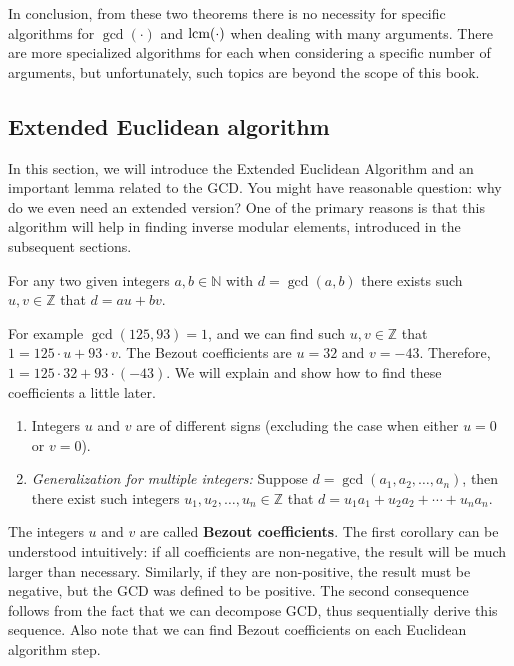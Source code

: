 \documentclass[../lecture-notes-148x210.tex]{subfiles}
\begin{document}
In conclusion, from these two theorems there is no necessity for specific
algorithms for $\gcd(\cdot)$ and $\text{lcm}(\cdot)$ when dealing with many arguments. There are
more specialized algorithms for each when considering a specific number of
arguments, but unfortunately, such topics are beyond the scope of this book.

\subsection{Extended Euclidean algorithm}

In this section, we will introduce the Extended Euclidean Algorithm and an
important lemma related to the GCD. You might have reasonable question: why do
we even need an extended version? One of the primary reasons is that this 
algorithm will help in finding inverse modular elements, introduced in the 
subsequent sections.

\begin{lemma}  \label{lemma:bezout_identity}
    For any two given integers $a, b \in \mathbb{N}$ with $d = \gcd(a, b)$ there exists such 
    $u, v \in \mathbb{Z}$ that $d = au + bv$.
\end{lemma}

\begin{example}
    For example $\gcd(125, 93) = 1$, and we can find 
    such $u, v \in \mathbb{Z}$ that $1 = 125 \cdot u + 93 \cdot v$. 
    The Bezout coefficients are $u = 32$ and $v = -43$.
    Therefore, $1 = 125 \cdot 32 + 93 \cdot (-43)$.
    We will explain and show how to find these coefficients a little later.
\end{example}

\begin{corollary} 
    \hfill
    \begin{enumerate}
        \item Integers $u$ and $v$ are of different signs (excluding the case when either $u=0$ or $v=0$).
        \item \textit{Generalization for multiple integers:} Suppose $d = \gcd(a_1, a_2, \dots, a_n)$, then there 
        exist such integers $u_1, u_2, \dots, u_n \in \mathbb{Z}$ that $d = u_1 a_1 + u_2 a_2 + \cdots + u_n a_n$.
    \end{enumerate}    
\end{corollary}

The integers $u$ and $v$ are called \textbf{Bezout coefficients}. The first
corollary can be understood intuitively: if all coefficients are non-negative,
the result will be much larger than necessary. Similarly, if they are
non-positive, the result must be negative, but the GCD was defined to be
positive. The second consequence follows from the fact that we can decompose
GCD, thus sequentially derive this sequence. Also note that we can find Bezout
coefficients on each Euclidean algorithm step.
\end{document}
